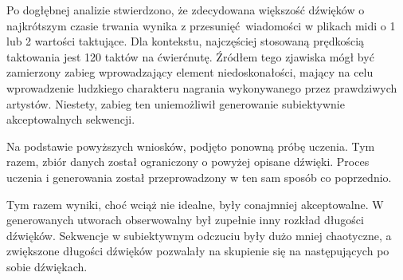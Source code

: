 {{        \bigskip

        Po dogłębnej analizie stwierdzono, że zdecydowana większość dźwięków o\,\,najkrótszym czasie trwania
        wynika z\,\,przesunięć wiadomości w\,\,plikach midi o\,\,1 lub 2 wartości taktujące. Dla kontekstu, najczęściej stosowaną
        prędkością taktowania jest 120 taktów na ćwierćnutę. Źródłem tego zjawiska mógł być zamierzony 
        zabieg wprowadzający element niedoskonałości, mający na celu wprowadzenie ludzkiego charakteru nagrania 
        wykonywanego przez prawdziwych artystów.
        Niestety, zabieg ten uniemożliwił generowanie subiektywnie akceptowalnych sekwencji.

        Na podstawie powyższych wniosków, podjęto ponowną próbę uczenia. Tym razem, zbiór danych został
        ograniczony o\,\,powyżej opisane dźwięki. Proces uczenia i\,\,generowania został przeprowadzony w\,\,ten sam sposób
        co poprzednio. 




        \bigskip

        Tym razem wyniki, choć wciąż nie idealne, były conajmniej akceptowalne. W\,\,generowanych utworach
        obserwowalny był zupełnie inny rozkład długości dźwięków. Sekwencje w\,\,subiektywnym odczuciu były dużo mniej
        chaotyczne, a\,\,zwiększone długości dźwięków pozwalały na skupienie się na następujących po sobie dźwiękach.
        
}}
